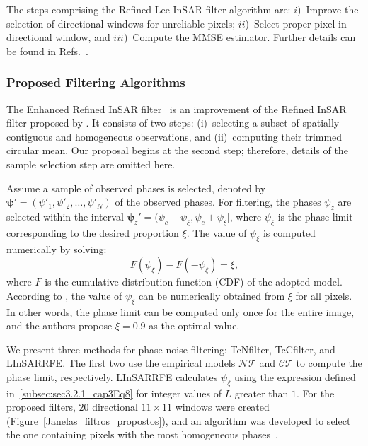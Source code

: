 \documentclass[remotesensing,article,submit,pdftex,moreauthors]{Definitions/mdpi}
\begin{document}
The steps comprising the Refined Lee InSAR filter algorithm are: 
$i$)~Improve the selection of directional windows for unreliable pixels; 
$ii$)~Select proper pixel in directional window, 
and $iii$)~Compute the MMSE estimator. 
Further details can be found in Refs.~\cite{RefinedFilteringofInterferometricPhaseFromInSARData, EnhancedInterferometricPhaseNoiseFilteringoftheRefinedInSARFilter}.

\subsubsection{Proposed Filtering Algorithms}\label{sec:pro}

The Enhanced Refined InSAR filter~\cite{EnhancedInterferometricPhaseNoiseFilteringoftheRefinedInSARFilter} is an improvement of the Refined InSAR filter proposed by \citet{RefinedFilteringofInterferometricPhaseFromInSARData}.
It consists of two steps: 
(i)~selecting a subset of spatially contiguous and homogeneous observations, 
and (ii)~computing their trimmed circular mean.
Our proposal begins at the second step; therefore, details of the sample selection step are omitted here.

Assume a sample of observed phases is selected, denoted by $\bm{\psi'} = (\psi'_1, \psi'_2, \dots, \psi'_N)$ of the observed phases. For filtering, the phases $\psi_z$ are selected within the interval $\bm\psi_z' = (\psi_c - \psi_\xi, \psi_c + \psi_\xi]$, where $\psi_\xi$ is the phase limit corresponding to the desired proportion $\xi$. The value of $\psi_\xi$ is computed numerically by solving:
\begin{equation}\label{Eq_limite_fase}
	F(\psi_\xi) - F(-\psi_\xi) = \xi,
\end{equation}
where $F$ is the cumulative distribution function (CDF) of the adopted model. 
According to \citet{RefinedFilteringofInterferometricPhaseFromInSARData}, the value of $\psi_\xi$ can be numerically obtained from $\xi$ for all pixels. 
In other words, the phase limit can be computed only once for the entire image, and the authors propose $\xi=0.9$ as the optimal value.

We present three methods for phase noise filtering: TcNfilter, TcCfilter, and LInSARRFE. 
The first two use the empirical models $\mathcal{NT}$ and $\mathcal{CT}$ to compute the phase limit, respectively. 
LInSARRFE calculates $\psi_{\xi}$ using the expression defined in~\eqref{subsec:sec3.2.1_cap3Eq8} for integer values of $L$ greater than $1$. For the proposed filters, $20$ directional $11\times11$ windows were created (Figure~\ref{Janelas_filtros_propostos}), and an algorithm was developed to select the one containing pixels with the most homogeneous phases~\cite{EnhancedInterferometricPhaseNoiseFilteringoftheRefinedInSARFilter}.
\end{document}
